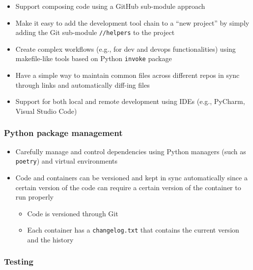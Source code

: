 \begin{itemize}
  \item Support composing code using a GitHub sub-module approach

  \item Make it easy to add the development tool chain to a ``new project''
    by simply adding the Git sub-module \texttt{//helpers} to the
    project

  \item Create complex workflows (e.g., for dev and devops
    functionalities) using makefile-like tools based on Python \texttt{invoke}
    package

  \item Have a simple way to maintain common files across different repos
    in sync through links and automatically diff-ing files

  \item Support for both local and remote development using IDEs (e.g.,
    PyCharm, Visual Studio Code)
\end{itemize}

\subsubsection{Python package management}

\begin{itemize}
  \item Carefully manage and control dependencies using Python managers
    (such as \texttt{poetry}) and virtual environments

  \item Code and containers can be versioned and kept in sync automatically
    since a certain version of the code can require a certain version of
    the container to run properly

    \begin{itemize}
      \item Code is versioned through Git

      \item Each container has a \texttt{changelog.txt} that contains
        the current version and the history
    \end{itemize}
\end{itemize}

\subsubsection{Testing}


